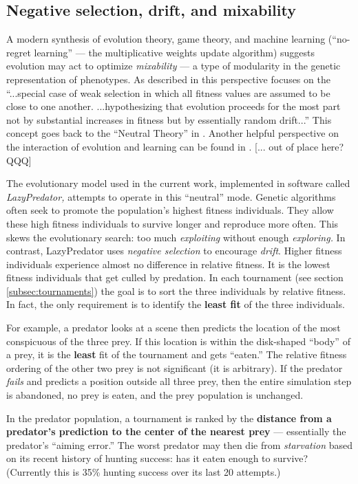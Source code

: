 \documentclass[acmtog]{acmart}
\newcommand{\jargon}[1]{\textit{#1}}
\begin{document}
\subsection{Negative selection, drift, and mixability}

A modern synthesis \cite{livnat_sex_2016} of evolution theory, game theory, and machine learning (“no-regret learning” — the multiplicative weights update algorithm) suggests evolution may act to optimize \jargon{mixability} — a type of modularity in the genetic representation of phenotypes. As described in \citet{chastain_multiplicative_2013} this perspective focuses on the “...special case of weak selection in which all fitness values are assumed to be close to one another. ...hypothesizing that evolution proceeds for the most part not by substantial increases in fitness but by essentially random drift...” This concept goes back to the “Neutral Theory” in \citet{kimura_evolutionary_1968}. Another helpful perspective on the interaction of evolution and learning can be found in \citet{valiant_probably_2013}. [... out of place here? QQQ]
\par
The evolutionary model used in the current work, implemented in software called \jargon{LazyPredator,} attempts to operate in this “neutral” mode. Genetic algorithms often seek to promote the population's highest fitness individuals. They allow these high fitness individuals to survive longer and reproduce more often. This skews the evolutionary search: too much \jargon{exploiting} without enough \jargon{exploring.}  In contrast, LazyPredator uses \textit{negative selection} to encourage \jargon{drift}. Higher fitness individuals experience almost no difference in  relative fitness. It is the lowest fitness individuals that get culled by predation. In each tournament (see section \ref{subsec:tournaments}) the goal is to sort the three individuals by relative fitness. In fact, the only requirement is to identify the \textbf{least fit} of the three individuals.
\par 
For example, a predator looks at a scene then predicts the location of the most conspicuous of the three prey. If this location is within the disk-shaped “body” of a prey, it is the \textbf{least} fit of the tournament and gets “eaten.” The relative fitness ordering of the other two prey is not significant (it is arbitrary). If the predator \jargon{fails} and predicts a position outside all three prey, then the entire simulation step is abandoned, no prey is eaten, and the prey population is unchanged.
\par
In the predator population, a tournament is ranked by the \textbf{distance from a predator's prediction to the center of the nearest prey} — essentially the predator's “aiming error.” The worst predator may then die from \jargon{starvation} based on its recent history of hunting success: has it eaten enough to survive? (Currently this is 35\% hunting success over its last 20 attempts.)
\end{document}
